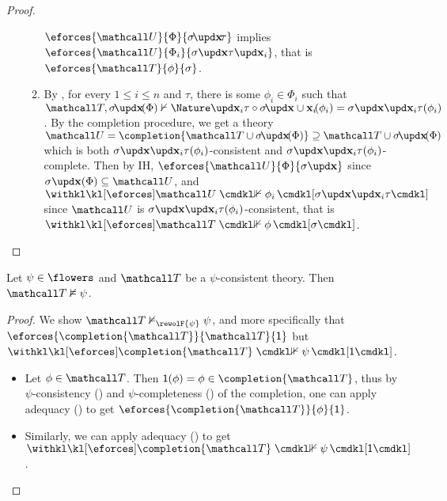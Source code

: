 \begin{scope}
\begin{proof}
\begin{itemize}
\begin{enumerate}
      $\eforces{\tU}{\Phi}{\restr{\sigma}{\bx}\tau}$ implies
      $\eforces{\tU}{\Phi_i}{\update{\update{\sigma}{\bx}{\tau}}{\bx_i}{}}$,
      that is $\eforces{\tT}{\phi}{\sigma}$.
      \item By , for every $1 \leq i \leq n$ and
       $\tau$, there is some $\phi_i \in \Phi_i$ such that $\tT,
      \restr{\sigma}{\bx}(\Phi) \nvdash{\Nature} \update{}{\bx_i}{\tau} \circ
      \restr{\sigma}{\bx \cup \bx_i}(\phi_i) =
      \update{\update{\sigma}{\bx}{}}{\bx_i}{\tau}(\phi_i)$. By the completion
      procedure, we get a theory $\tU = \completion{\tT \cup
      \restr{\sigma}{\bx}(\Phi)} \supseteq \tT \cup \restr{\sigma}{\bx}(\Phi)$
      which is both
      $\update{\update{\sigma}{\bx}{}}{\bx_i}{\tau}(\phi_i)$-consistent and
      $\update{\update{\sigma}{\bx}{}}{\bx_i}{\tau}(\phi_i)$-complete. Then by
      IH, $\eforces{\tU}{\Phi}{\update{\sigma}{\bx}{}}$ since
      $\update{\sigma}{\bx}{}(\Phi) \subseteq \tU$, and
      $\neforces{\tU}{\phi_i}{\update{\update{\sigma}{\bx}{}}{\bx_i}{\tau}}$
      since $\tU$ is
      $\update{\update{\sigma}{\bx}{}}{\bx_i}{\tau}(\phi_i)$-consistent, that is
      $\neforces{\tT}{\phi}{\sigma}$.
    \end{enumerate}
  \end{itemize}
\end{proof}

\begin{lemma}
  
  Let $\psi \in \flowers$ and $\tT$ be a $\psi$-consistent theory. Then $\tT
  \nvDash \psi$.
\end{lemma}
\begin{proof}
  We show $\tT \nvDash_{\rewolF{\psi}} \psi$, and more specifically that
  $\eforces{\completion{\tT}}{\tT}{\idsubst}$ but
  $\neforces{\completion{\tT}}{\psi}{\idsubst}$.
  \begin{itemize}
    \item Let $\phi \in \tT$. Then $\idsubst(\phi) = \phi \in \completion{\tT}$,
    thus by $\psi$-consistency () and
    $\psi$-completeness () of the completion, one
    can apply adequacy () to get
    $\eforces{\completion{\tT}}{\phi}{\idsubst}$.
    \item Similarly, we can apply adequacy () to get
    $\neforces{\completion{\tT}}{\psi}{\idsubst}$.
  \end{itemize}
\end{proof}


\end{scope}
